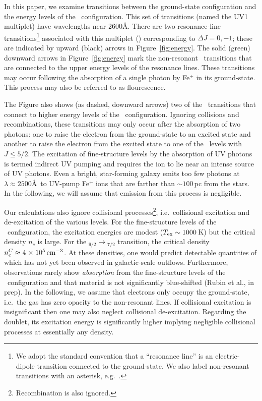 \documentclass[12pt,preprint]{aastex}
\begin{document}
In this paper, we examine transitions between the ground-state
configuration and the energy levels of the \zconfig\
configuration.  This set of transitions (named the
UV1 multiplet) have wavelengths near 2600\AA.
There are two resonance-line transitions\footnote{We adopt the
  standard convention that a ``resonance line'' is an electric-dipole
  transition connected to the ground-state.  We also label
  non-resonant transitions with an asterisk, e.g.\ \feiic.} 
associated with this multiplet (\feiid)
corresponding to $\Delta J = 0, -1$; these are indicated by upward (black) arrows
in Figure~\ref{fig:energy}. The solid (green) downward
arrows in Figure~\ref{fig:energy} mark the non-resonant \feiis\
transitions that are connected to
the upper energy levels of the resonance lines.  These transitions may
occur following the absorption of a single photon by Fe$^+$ in its
ground-state.   This process may also be referred to as flourescence.

The Figure also shows (as dashed, downward arrows) two of the
\feiis\ transitions that connect to higher energy levels of the \zconfig\
configuration.  Ignoring collisions and recombinations, these
transitions may only occur after the absorption
of two photons: one to raise the electron from the ground-state to an
excited state and another to raise the electron from the excited state
to one of the \zconfig\ levels with $J \le 5/2$.  The excitation of
fine-structure levels by 
the absorption of UV photons is termed indirect UV pumping
\citep[e.g][]{silva02,pcb06} and requires the ion to lie
near an intense source of UV photons.  
Even a bright, star-forming galaxy emits too few photons at $\lambda
\approx 2500$\AA\ to UV-pump Fe$^+$ ions that are farther than $\sim
100$\,pc from the stars.
In the
following, we will assume that emission from this process is
negligible.

Our calculations also ignore collisional
processes\footnote{Recombination is also ignored.}, i.e.\ collisional
excitation and de-excitation of the various levels.  For the
fine-structure levels of the \aconfig\ configuration, the excitation
energies are modest ($T_{\rm ex} \sim 1000$\,K) but the critical
density $n_c$ is large.  For the \aconfig$_{9/2} \to
$\aconfig$_{7/2}$ transition, the critical density $n_e^C \approx 4
{\; \times \; 10^{5}} \, {\rm cm^{-3}}$.  At these densities, one would predict  
detectable quantities of \ion{Fe}{1} which has not yet been observed
in galactic-scale outflows. Furthermore, observations rarely show
{\it absorption} from the
fine-structure levels of the \aconfig\ configuration and that material
is not significantly blue-shifted (Rubin et al., in prep). 
In the following, we assume that electrons only occupy the
ground-state, i.e.\ the gas has zero opacity to the non-resonant
lines.
If collisional excitation is insignificant 
then one may also neglect collisional de-excitation.  
Regarding the  doublet, its
excitation energy is significantly higher implying 
negligible collisional processes at essentially any density.
\end{document}
